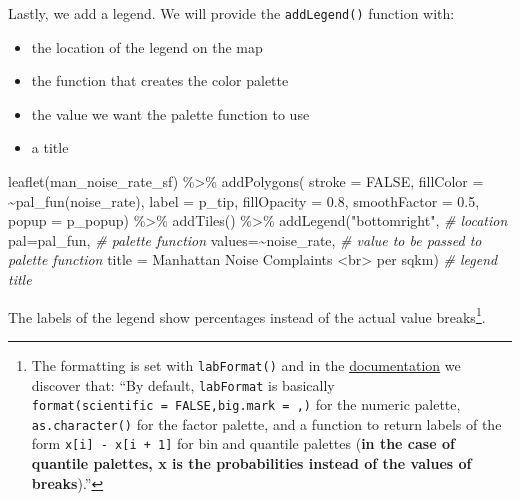 \documentclass[
  11pt,
]{book}
\newenvironment{Shaded}{\begin{snugshade}}{\end{snugshade}}
\newcommand{\AttributeTok}[1]{\textcolor[rgb]{0.77,0.63,0.00}{#1}}
\newcommand{\CommentTok}[1]{\textcolor[rgb]{0.56,0.35,0.01}{\textit{#1}}}
\newcommand{\ConstantTok}[1]{\textcolor[rgb]{0.00,0.00,0.00}{#1}}
\newcommand{\FloatTok}[1]{\textcolor[rgb]{0.00,0.00,0.81}{#1}}
\newcommand{\FunctionTok}[1]{\textcolor[rgb]{0.00,0.00,0.00}{#1}}
\newcommand{\NormalTok}[1]{#1}
\newcommand{\SpecialCharTok}[1]{\textcolor[rgb]{0.00,0.00,0.00}{#1}}
\newcommand{\StringTok}[1]{\textcolor[rgb]{0.31,0.60,0.02}{#1}}
\providecommand{\tightlist}{%
  \setlength{\itemsep}{0pt}\setlength{\parskip}{0pt}}
\begin{document}
Lastly, we add a legend. We will provide the \texttt{addLegend()} function with:

\begin{itemize}
\tightlist
\item
  the location of the legend on the map\\
\item
  the function that creates the color palette\\
\item
  the value we want the palette function to use\\
\item
  a title
\end{itemize}

\begin{Shaded}
\begin{Highlighting}[]
\FunctionTok{leaflet}\NormalTok{(man\_noise\_rate\_sf) }\SpecialCharTok{\%\textgreater{}\%}
  \FunctionTok{addPolygons}\NormalTok{(}
    \AttributeTok{stroke =} \ConstantTok{FALSE}\NormalTok{, }
    \AttributeTok{fillColor =} \SpecialCharTok{\textasciitilde{}}\FunctionTok{pal\_fun}\NormalTok{(noise\_rate),}
    \AttributeTok{label =}\NormalTok{ p\_tip,}
    \AttributeTok{fillOpacity =} \FloatTok{0.8}\NormalTok{, }\AttributeTok{smoothFactor =} \FloatTok{0.5}\NormalTok{,}
    \AttributeTok{popup =}\NormalTok{ p\_popup) }\SpecialCharTok{\%\textgreater{}\%}
  \FunctionTok{addTiles}\NormalTok{() }\SpecialCharTok{\%\textgreater{}\%}
  \FunctionTok{addLegend}\NormalTok{(}\StringTok{"bottomright"}\NormalTok{,  }\CommentTok{\# location}
            \AttributeTok{pal=}\NormalTok{pal\_fun,    }\CommentTok{\# palette function}
            \AttributeTok{values=}\SpecialCharTok{\textasciitilde{}}\NormalTok{noise\_rate,  }\CommentTok{\# value to be passed to palette function}
            \AttributeTok{title =} \StringTok{\textquotesingle{}Manhattan Noise Complaints \textless{}br\textgreater{} per sqkm\textquotesingle{}}\NormalTok{) }\CommentTok{\# legend title}
\end{Highlighting}
\end{Shaded}

The labels of the legend show percentages instead of the actual value breaks\footnote{The formatting is set with \texttt{labFormat()} and in the \href{https://cran.r-project.org/web/packages/leaflet/leaflet.pdf}{documentation} we discover that: ``By default, \texttt{labFormat} is basically \texttt{format(scientific\ =\ FALSE,big.mark\ =\ \textquotesingle{},\textquotesingle{})} for the numeric palette, \texttt{as.character()} for the factor palette, and a function to return labels of the form \texttt{x{[}i{]}\ -\ x{[}i\ +\ 1{]}} for bin and quantile palettes (\textbf{in the case of quantile palettes, x is the probabilities instead of the values of breaks}).''}.
\end{document}
